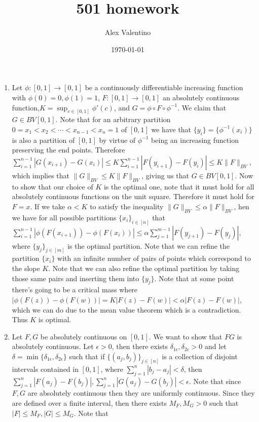 \documentclass[12pt, letterpaper]{article}
\date{\today}
\author{Alex Valentino}
\title{501 homework}
\begin{document}
\begin{enumerate}
	\item Let $\phi: [0,1] \to [0,1]$ be a continuously differentiable increasing
	 function with $\phi(0) = 0, \phi(1) = 1$, $F: [0,1] \to [0,1]$ an absolutely
	 continuous function,$K = \sup_{c \in [0,1]} \phi'(c)$, and $G = \phi \circ F \circ \phi^{-1}$.  We claim that $G \in BV[0,1]$.  Note that for an arbitrary partition 
	 $0 = x_1 < x_2 < \cdots  < x_{n-1} < x_n = 1$ of $[0,1]$ we have that 
	 $\{y_i\} = \{\phi^{-1}(x_i)\}$ is also a partition of $[0,1]$ by virtue of $\phi^{-1}$
	 being an increasing function preserving the end points.  Therefore
	 $\sum_{i=1}^{n-1} |G(x_{i+1}) - G(x_i)| \leq K 
	 \sum_{i=1}^{n-1} |F(y_{i+1}) - F(y_i)| \leq K \| F\|_{BV}$, which implies that 
	 $\|G\|_{BV} \leq K\|F\|_{BV}$, giving us that $G \in BV[0,1]$.  Now to show 
	 that our choice of $K$ is the optimal one, note that it must hold for all 
	 absolutely continuous functions on the unit square.  Therefore it must hold for 
	 $F = x$.  If we take $\alpha < K$ to satisfy the inequality 
	 $\|G\|_{BV} \leq \alpha\|F\|_{BV}$, hen we have for all possible partitions 
	 $\{x_i\}_{i \in [n]}$ that $\sum_{i=1}^{n-1} |\phi(F(x_{i+1})) - \phi(F(x_i))|
	 \leq \alpha   \sum_{j=1}^{m-1} |F(y_{j+1}) - F(y_{j})|$, where $\{y_j\}_{j \in [m]}$ is the optimal partition.  Note that we can refine the partition $\{x_i\}$ with 
	 an infinite number of pairs of points which correspond to the slope $K$.
	 Note that we can also refine the optimal partition by taking those same pairs and 
	 inserting them into $\{y_j\}$. Note that at some point there's going to be 
	 a critical mass where $|\phi(F(z)) - \phi(F(w))| = K|F(z)-F(w)| < \alpha |F(z)-F(w)|$, which we can do due to the mean value theorem
	 which is a contradiction.  Thus $K$ is optimal.
	\item Let $F,G$ be absolutely continuous on $[0,1]$.  We want to show that $FG$
	is absolutely continuous.  Let $\epsilon > 0$, then there exists 
	$\delta_{1\epsilon}, \delta_{2\epsilon} > 0$ and let $\delta = \min\{\delta_{1\epsilon}, \delta_{2\epsilon} \}$ such that if  $\{(a_j, b_j)\}_{j \in [n]}$ is a collection
	of disjoint intervals contained in $[0,1]$, where 
	$\sum_{j=1}^n |b_j - a_j| < \delta$, then 
	$\sum_{j=1}^n |F(a_j) - F(b_j)|, \sum_{j=1}^n |G(a_j) - G(b_j)| < \epsilon$.    
	Note that since $F,G$ are absolutely continuous then they are uniformly continuous.
	Since they are defined over a finite interval, then there exists $M_F, M_G > 0$
	such that $|F| \leq M_F, |G| \leq M_G$.   Note that 
	\begin{align*}

\end{align*}
\end{enumerate}
\end{document}
